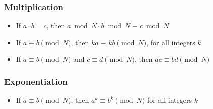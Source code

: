 \documentclass[12pt]{article}
\begin{document}
\subsubsection{Multiplication}
\begin{itemize}
    \item If $a \cdot b = c$, then $a \bmod N \cdot b \bmod N \equiv c \bmod N$
    \item If $a \equiv b \pmod N$, then $ka \equiv kb \pmod N$, for all integers $k$
    \item If $a \equiv b \pmod N$ and $c \equiv d \pmod N$, then $ac \equiv bd \pmod N$
\end{itemize}

\subsubsection{Exponentiation}
\begin{itemize}
    \item If $a \equiv b \pmod N$, then $a^k \equiv b^k \pmod N$ for all integers $k$
\end{itemize}
\end{document}
